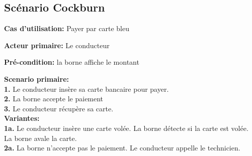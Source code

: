 \subsection{Scénario Cockburn}
\textbf{Cas d'utilisation:} Payer par carte bleu

\textbf{Acteur primaire:} Le conducteur


\textbf{Pré-condition: } la borne affiche le montant

 

\textbf{Scenario primaire: } \\
    \textbf{1.} Le conducteur insère sa carte bancaire pour payer. \\ %
    \textbf{2.} La borne accepte le paiement \\
    \textbf{3.} Le conducteur récupère sa carte.\\

\textbf{Variantes:}\\
    \textbf{1a.} Le conducteur insère une carte volée. La borne détecte si la carte est volée. La borne avale la carte.\\
    \textbf{2a.} La borne n’accepte pas le paiement. Le conducteur appelle le technicien. \\
    
\newpage
